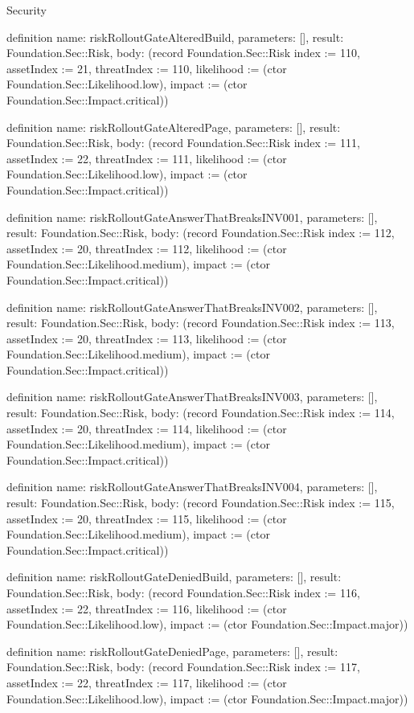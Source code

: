 \begin{lexlean}{Security}
\begin{semanticmodule}
definition{
  name: riskRolloutGateAlteredBuild,
  parameters: [],
  result: Foundation.Sec::Risk,
  body: (record Foundation.Sec::Risk {index := 110, assetIndex := 21, threatIndex := 110, likelihood := (ctor Foundation.Sec::Likelihood.low), impact := (ctor Foundation.Sec::Impact.critical)})
}

definition{
  name: riskRolloutGateAlteredPage,
  parameters: [],
  result: Foundation.Sec::Risk,
  body: (record Foundation.Sec::Risk {index := 111, assetIndex := 22, threatIndex := 111, likelihood := (ctor Foundation.Sec::Likelihood.low), impact := (ctor Foundation.Sec::Impact.critical)})
}

definition{
  name: riskRolloutGateAnswerThatBreaksINV001,
  parameters: [],
  result: Foundation.Sec::Risk,
  body: (record Foundation.Sec::Risk {index := 112, assetIndex := 20, threatIndex := 112, likelihood := (ctor Foundation.Sec::Likelihood.medium), impact := (ctor Foundation.Sec::Impact.critical)})
}

definition{
  name: riskRolloutGateAnswerThatBreaksINV002,
  parameters: [],
  result: Foundation.Sec::Risk,
  body: (record Foundation.Sec::Risk {index := 113, assetIndex := 20, threatIndex := 113, likelihood := (ctor Foundation.Sec::Likelihood.medium), impact := (ctor Foundation.Sec::Impact.critical)})
}

definition{
  name: riskRolloutGateAnswerThatBreaksINV003,
  parameters: [],
  result: Foundation.Sec::Risk,
  body: (record Foundation.Sec::Risk {index := 114, assetIndex := 20, threatIndex := 114, likelihood := (ctor Foundation.Sec::Likelihood.medium), impact := (ctor Foundation.Sec::Impact.critical)})
}

definition{
  name: riskRolloutGateAnswerThatBreaksINV004,
  parameters: [],
  result: Foundation.Sec::Risk,
  body: (record Foundation.Sec::Risk {index := 115, assetIndex := 20, threatIndex := 115, likelihood := (ctor Foundation.Sec::Likelihood.medium), impact := (ctor Foundation.Sec::Impact.critical)})
}

definition{
  name: riskRolloutGateDeniedBuild,
  parameters: [],
  result: Foundation.Sec::Risk,
  body: (record Foundation.Sec::Risk {index := 116, assetIndex := 22, threatIndex := 116, likelihood := (ctor Foundation.Sec::Likelihood.low), impact := (ctor Foundation.Sec::Impact.major)})
}

definition{
  name: riskRolloutGateDeniedPage,
  parameters: [],
  result: Foundation.Sec::Risk,
  body: (record Foundation.Sec::Risk {index := 117, assetIndex := 22, threatIndex := 117, likelihood := (ctor Foundation.Sec::Likelihood.low), impact := (ctor Foundation.Sec::Impact.major)})
}


\end{semanticmodule}
\end{lexlean}

